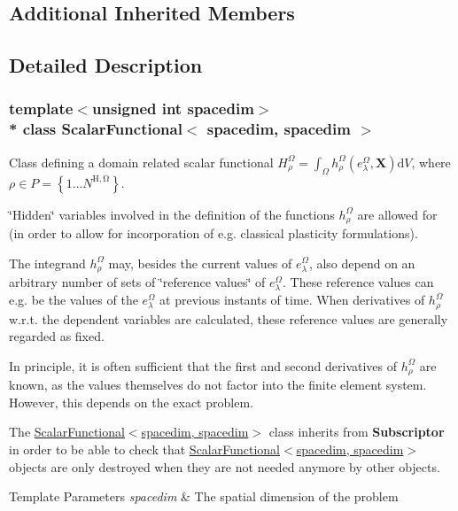\subsection*{Additional Inherited Members}


\subsection{Detailed Description}
\subsubsection*{template$<$unsigned int spacedim$>$\\*
class Scalar\+Functional$<$ spacedim, spacedim $>$}

Class defining a domain related scalar functional $H^\Omega_\rho = \int_\Omega h^\Omega_\rho(e^\Omega_\lambda, \boldsymbol{X}) \mathrm{d}V$, where $\rho \in P=\left\{1 \hdots N^\mathrm{H,\Omega}\right\}$.

\char`\"{}\+Hidden\char`\"{} variables involved in the definition of the functions $h^\Omega_\rho$ are allowed for (in order to allow for incorporation of e.\+g. classical plasticity formulations).

The integrand $h^\Omega_\rho$ may, besides the current values of $e^\Omega_\lambda$, also depend on an arbitrary number of sets of \char`\"{}reference values\char`\"{} of $e^\Omega_\lambda$. These reference values can e.\+g. be the values of the $e^\Omega_\lambda$ at previous instants of time. When derivatives of $h^\Omega_\rho$ w.\+r.\+t. the dependent variables are calculated, these reference values are generally regarded as fixed.

In principle, it is often sufficient that the first and second derivatives of $h^\Omega_\rho$ are known, as the values themselves do not factor into the finite element system. However, this depends on the exact problem.

The \hyperlink{class_scalar_functional_3_01spacedim_00_01spacedim_01_4}{Scalar\+Functional$<$spacedim, spacedim$>$} class inherits from {\bf Subscriptor} in order to be able to check that \hyperlink{class_scalar_functional_3_01spacedim_00_01spacedim_01_4}{Scalar\+Functional$<$spacedim, spacedim$>$} objects are only destroyed when they are not needed anymore by other objects.


\begin{DoxyTemplParams}{Template Parameters}
{\em spacedim} & The spatial dimension of the problem \\
\hline
\end{DoxyTemplParams}


